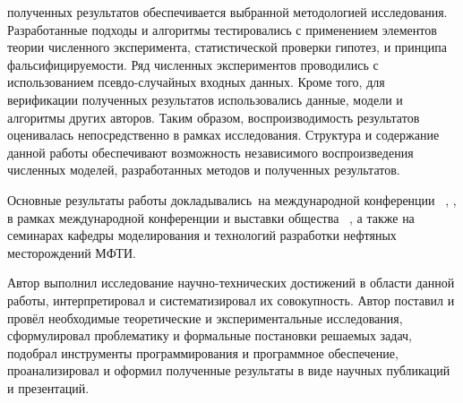{\reliability} полученных результатов обеспечивается выбранной методологией исследования.
Разработанные подходы и алгоритмы тестировались с применением элементов теории численного эксперимента, статистической проверки гипотез, и принципа фальсифицируемости.
Ряд численных экспериментов проводились с использованием псевдо-случайных входных данных.
Кроме того, для верификации полученных результатов использовались данные, модели и алгоритмы других авторов.
Таким образом, воспроизводимость результатов оценивалась непосредственно в рамках исследования.
Структура и содержание данной работы обеспечивают возможность независимого воспроизведения численных моделей, разработанных методов и полученных результатов.

{\probation}
Основные результаты работы докладывались~на международной конференции \frqq~\cite{Elizarev2022,Elizarev2020}, , в рамках международной конференции и выставки общества \frqq~\cite{Elizarev_2019}, а также на семинарах кафедры моделирования и технологий разработки нефтяных месторождений МФТИ.

{\contribution} Автор выполнил исследование научно-технических достижений в области данной работы, интерпретировал и систематизировал их совокупность. Автор поставил и провёл необходимые теоретические и экспериментальные исследования, сформулировал проблематику и формальные постановки решаемых задач, подобрал инструменты программирования и программное обеспечение, проанализировал и оформил полученные результаты в виде научных публикаций и презентаций.

